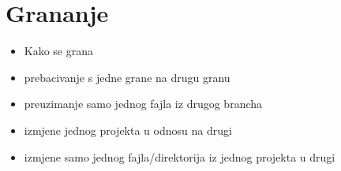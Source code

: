 \chapter*{Grananje}

\begin{itemize}
   \item Kako se grana
   \item prebacivanje s jedne grane na drugu granu
   \item preuzimanje samo jednog fajla iz drugog brancha
   \item izmjene jednog projekta u odnosu na drugi
   \item izmjene samo jednog fajla/direktorija iz jednog projekta u drugi
\end{itemize}


